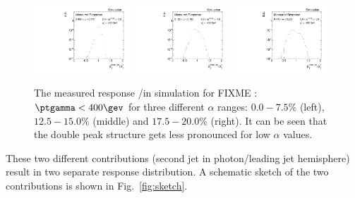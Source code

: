 \begin{figure}[b]
 \centering
     \includegraphics[width=0.32\textwidth]{figures/resolution/methodology/fullResponse_1_alpha_bin.pdf}
     \includegraphics[width=0.32\textwidth]{figures/resolution/methodology/fullResponse_4_alpha_bin.pdf}
     \includegraphics[width=0.32\textwidth]{figures/resolution/methodology/fullResponse_6_alpha_bin.pdf}
  \caption{The measured response \ptrecojet/\ptgamma in simulation for FIXME : $\ptgamma < 400 \gev$ for three different $\alpha$ ranges: $0.0-7.5\%$ (left), $12.5-15.0\%$ (middle) and $17.5-20.0\%$ (right). 
           It can be seen that the double peak structure gets less pronounced for low $\alpha$ values.}  
 \label{fig:alphaBins}
\end{figure}

These two different contributions (second jet in photon/leading jet hemisphere) result in two separate response distribution.
A schematic sketch of the two contributions is shown in Fig.~\ref{fig:sketch}. 



